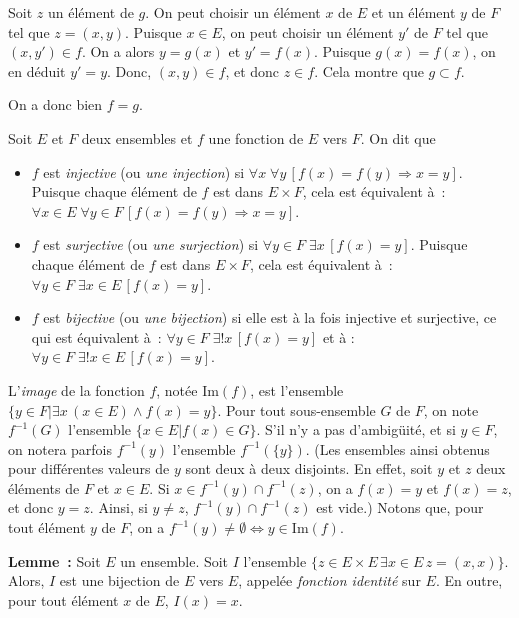     Soit $z$ un élément de $g$. 
    On peut choisir un élément $x$ de $E$ et un élément $y$ de $F$ tel que $z = (x,y)$. 
    Puisque $x \in E$, on peut choisir un élément $y'$ de $F$ tel que $(x,y') \in f$. 
    On a alors $y = g(x)$ et $y' = f(x)$. 
    Puisque $g(x) = f(x)$, on en déduit $y' = y$. 
    Donc, $(x,y) \in f$, et donc $z \in f$. 
    Cela montre que $g \subset f$.

    On a donc bien $f = g$. 

   \done 

\medskip

Soit $E$ et $F$ deux ensembles et $f$ une fonction de $E$ vers $F$. 
On dit que
\begin{itemize}[nosep]
    \item $f$ est \textit{injective} (ou \textit{une injection}) si $\forall x \; \forall y \, [f(x) = f(y) \Rightarrow x = y]$.
        Puisque chaque élément de $f$ est dans $E \times F$, cela est équivalent à : $\forall x \in E \; \forall y \in F \, [f(x) = f(y) \Rightarrow x = y]$.
    \item $f$ est \textit{surjective} (ou \textit{une surjection}) si $\forall y \in F \; \exists x \, [f(x) = y]$.
        Puisque chaque élément de $f$ est dans $E \times F$, cela est équivalent à : $\forall y \in F \; \exists x \in E \, [f(x) = y]$.
    \item $f$ est \textit{bijective} (ou \textit{une bijection}) si elle est à la fois injective et surjective, ce qui est équivalent à : $\forall y \in F \; \exists ! x \, [f(x) = y]$ et à : $\forall y \in F \; \exists ! x \in E \, [f(x) = y]$.
\end{itemize}
L'\textit{image} de la fonction $f$, notée $\mathrm{Im}(f)$, est l'ensemble $\lbrace y \in F \vert \exists x \, (x \in E) \wedge f(x) = y \rbrace$. 
Pour tout sous-ensemble $G$ de $F$, on note $f^{-1}(G)$ l'ensemble $\lbrace x \in E \vert f(x) \in G \rbrace$. 
S'il n'y a pas d'ambigüité, et si $y \in F$, on notera parfois $f^{-1}(y)$ l'ensemble $f^{-1}(\lbrace y \rbrace)$.
(Les ensembles ainsi obtenus pour différentes valeurs de $y$ sont deux à deux disjoints. 
En effet, soit $y$ et $z$ deux éléments de $F$ et $x \in E$. 
Si $x \in f^{-1}(y) \cap f^{-1}(z)$, on a $f(x) = y$ et $f(x) = z$, et donc $y = z$. 
Ainsi, si $y \neq z$, $f^{-1}(y) \cap f^{-1}(z)$ est vide.)
Notons que, pour tout élément $y$ de $F$, on a $f^{-1}(y) \neq \emptyset \Leftrightarrow y \in \mathrm{Im}(f)$. 

\medskip

\noindent\textbf{Lemme :} Soit $E$ un ensemble. 
    Soit $I$ l'ensemble $\lbrace z \in E \times E \, \exists x \in E \, z = (x,x) \rbrace$. 
    Alors, $I$ est une bijection de $E$ vers $E$, appelée \textit{fonction identité} sur $E$. 
    En outre, pour tout élément $x$ de $E$, $I(x) = x$.

